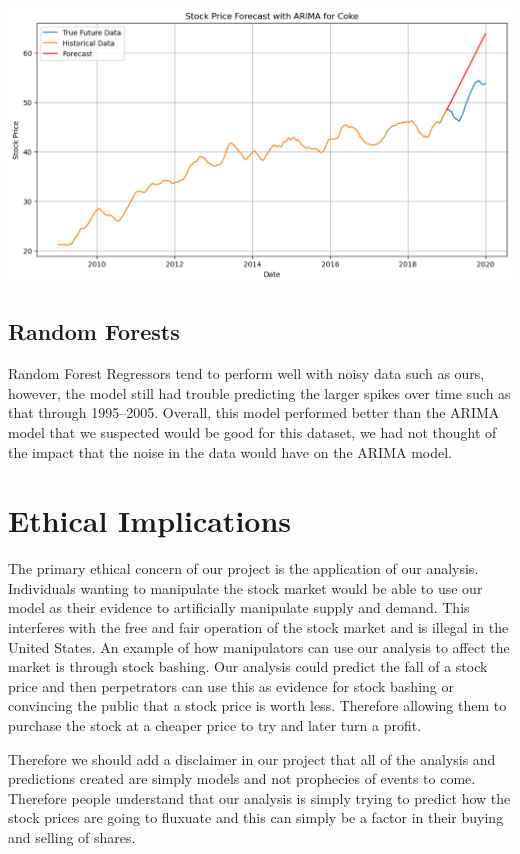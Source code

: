 \documentclass[12pt]{article}
\begin{document}
\includegraphics[width=\textwidth]{../images/ARIMA-Coke.pdf}


\subsection{Random Forests}
Random Forest Regressors tend to perform well with noisy data such as ours, however, the model still had 
trouble predicting the larger spikes over time such as that through 1995--2005. Overall, this model performed 
better than the ARIMA model that we suspected would be good for this dataset, we had not thought of the 
impact that the noise in the data would have on the ARIMA model.

\section{Ethical Implications}

The primary ethical concern of our project is the application of our analysis. Individuals wanting to manipulate the stock market would be able to use our model as their evidence to artificially manipulate supply and demand. This interferes with the free and fair operation of the stock market and is illegal in the United States. An example of how manipulators can use our analysis to affect the market is through stock bashing. Our analysis could predict the fall of a stock price and then perpetrators can use this as evidence for stock bashing or convincing the public that a stock price is worth less. Therefore allowing them to purchase the stock at a cheaper price to try and later turn a profit. \par
Therefore we should add a disclaimer in our project that all of the analysis and predictions created are simply models and not prophecies of events to come. Therefore people understand that our analysis is simply trying to predict how the stock prices are going to fluxuate and this can simply be a factor in their buying and selling of shares.
\end{document}
